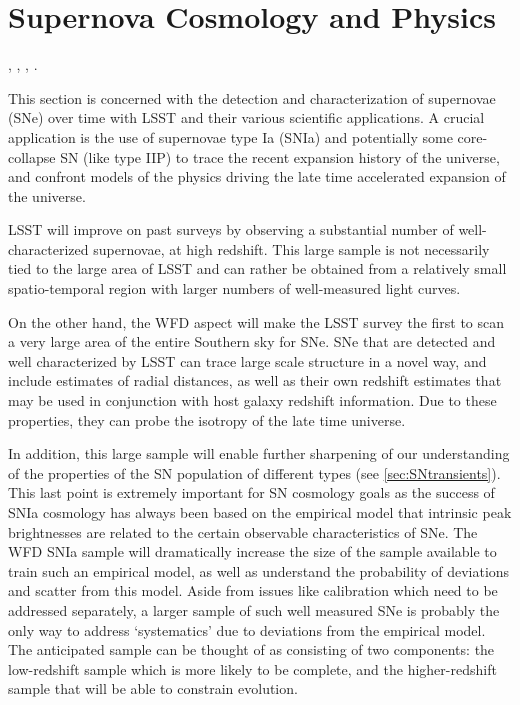 %
%
%

\section{Supernova Cosmology and Physics}
\def\secname{supernovae}\label{sec:\secname}

,
,
,
.

This section is concerned with the detection and characterization of
supernovae (SNe) over time with LSST and their various scientific
applications. A crucial application is the use of supernovae type
Ia (SNIa) and potentially some core-collapse SN (like type IIP) to trace
the recent expansion history of the universe, and confront models of the
physics driving the late time accelerated expansion of the universe.

LSST will improve on past surveys by observing a substantial number of well-characterized 
supernovae, at high redshift. This large sample is not necessarily tied to the large area of LSST 
and can rather be obtained from a relatively small spatio-temporal region with larger numbers of 
well-measured light curves.

On the other hand, the WFD aspect will make the LSST survey 
the first to scan a very large area of the entire Southern sky for
SNe. SNe that are detected and well characterized by LSST can trace
large scale structure in a novel way, and include estimates of radial distances, as 
well as
their own redshift estimates that may be used in conjunction with host
galaxy redshift information. Due to these properties, they can probe the
isotropy of the late time universe.    

In addition, this large sample will
enable further sharpening of our understanding of the properties of the
SN population of different types (see \autoref{sec:SNtransients}). This last point is extremely 
important
for SN cosmology goals as the success of SNIa cosmology has always been
based on the empirical model that intrinsic peak brightnesses are
related to the certain observable characteristics of SNe.  The WFD SNIa
sample will dramatically increase the size of the sample available to
train such an empirical model, as well as understand the probability of
deviations and scatter from this model. Aside from issues like
calibration which need to be addressed separately, a larger sample of
such well measured SNe is probably the only way to address `systematics'
due to deviations from the empirical model. The anticipated sample can
be thought of as consisting of two components:  the low-redshift sample
which is more likely to be complete, and the higher-redshift sample that
will be able to constrain evolution.


